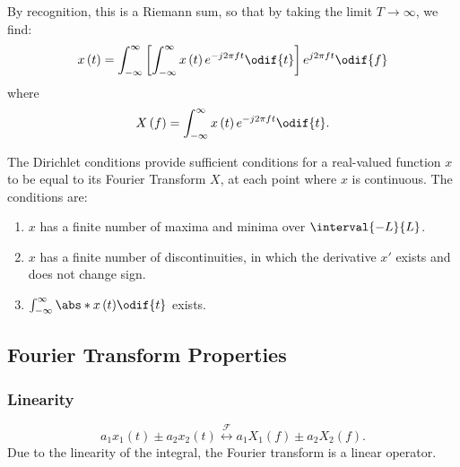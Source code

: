 \documentclass{article}
\begin{document}
By recognition, this is a Riemann sum, so that by taking the limit \(T \to \infty\), we find:
\begin{equation*}
    x\left( t \right) = \int_{-\infty}^\infty \left[ \int_{-\infty}^\infty x\left( t \right) e^{-j 2\pi f t} \odif{t} \right] e^{j 2\pi f t} \odif{f}
\end{equation*}
where
\begin{equation*}
    X\left( f \right) = \int_{-\infty}^\infty x\left( t \right) e^{-j 2\pi f t} \odif{t}.
\end{equation*}
\begin{corollary}
    The Dirichlet conditions provide sufficient conditions for a
    real-valued function \(x\) to be equal to its Fourier Transform
    \(X\), at each point where \(x\) is continuous. The conditions are:
    \begin{enumerate}
        \item \(x\) has a finite number of maxima and minima over \(\interval{-L}{L}\).
        \item \(x\) has a finite number of discontinuities, in which the
              derivative \(x'\) exists and does not change sign.
        \item \(\int_{-\infty}^\infty \abs*{x\left( t \right)} \odif{t}\) exists.
    \end{enumerate}
\end{corollary}
\subsection{Fourier Transform Properties}
\subsubsection{Linearity}
\begin{equation*}
    a_1 x_1\left( t \right) \pm a_2 x_2\left( t \right) \overset{\mathscr{F}}{\longleftrightarrow} a_1 X_1\left( f \right) \pm a_2 X_2\left( f \right).
\end{equation*}
Due to the linearity of the integral, the Fourier transform is a linear operator.
\end{document}
